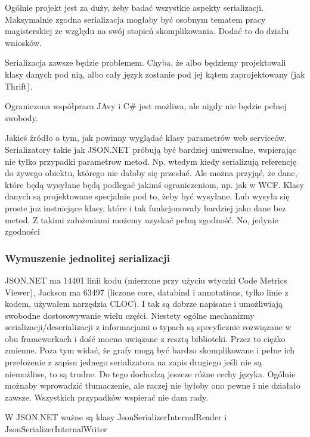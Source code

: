 Ogólnie projekt jest za duży, żeby badać wszystkie aspekty serializacji. Maksymalnie zgodna serializacja mogłaby być osobnym tematem pracy magisterskiej ze względu na swój stopień skomplikowania.
Dodać to do działu wniosków.

Serializacja zawsze będzie problemem. Chyba, że albo będziemy projektowali klasy danych pod nią, albo cały język zostanie pod jej kątem zaprojektowany (jak Thrift).

Ograniczona współpraca JAvy i C\# jest możliwa, ale nigdy nie będzie pełnej swobody.

Jakieś źródło o tym, jak powinny wyglądać klasy parametrów web serviceów.
Serializatory takie jak JSON.NET próbują być bardziej uniwersalne, wspierając nie tylko przypadki parametrow metod. Np. wtedym kiedy serializują referencję do żywego obiektu, którego nie dałoby się przesłać.
Ale można przyjąć, że dane, które będą wysyłane będą podlegać jakimś ograniczeniom, np. jak w WCF. Klasy danych są projektowane specjalnie pod to, żeby być wysyłane. Lub wysyła się proste juz instniejące klasy, które i tak funkcjonowały bardziej jako dane bez metod.
Z takimi założeniami możemy uzyskać pełną zgodność. No, jedynie zgodności

\subsubsection{Wymuszenie jednolitej serializacji}
JSON.NET ma 14401 linii kodu (mierzone przy użyciu wtyczki Code Metrics Viewer), Jackson ma 63497 (liczone core, databind i annotations, tylko linie z kodem, używałem narzędzia CLOC). I tak są dobrze napisane i umożliwiają swobodne dostosowywanie wielu części. Niestety ogólne mechanizmy serializacji/deserializacji z informacjami o typach są specyficznie rozwiązane w obu frameworkach i dość mocno uwiązane z resztą biblioteki. Przez to ciężko zmienne.
Poza tym widać, że grafy mogą być bardzo skomplikowane i pełne ich przełożenie z zapisu jednego serializatora na zapis drugiego jeśli nie są niemożliwe, to są trudne. Do tego dochodzą jeszcze różne cechy języka.
Ogólnie możnaby wprowadzić tłumaczenie, ale raczej nie byłoby ono pewne i nie działało zawsze.
Wszystkich przypadków wspierać nie dam rady.

W JSON.NET ważne są klasy JsonSerializerInternalReader i JsonSerializerInternalWriter

